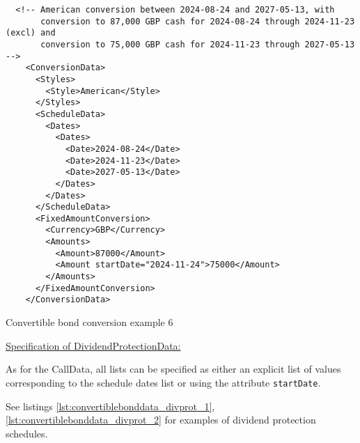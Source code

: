 \begin{listing}[H]
\begin{verbatim}
  <!-- American conversion between 2024-08-24 and 2027-05-13, with
       conversion to 87,000 GBP cash for 2024-08-24 through 2024-11-23 (excl) and
       conversion to 75,000 GBP cash for 2024-11-23 through 2027-05-13 -->
    <ConversionData>
      <Styles>
        <Style>American</Style>
      </Styles>
      <ScheduleData>
        <Dates>
          <Dates>
            <Date>2024-08-24</Date>
            <Date>2024-11-23</Date>
            <Date>2027-05-13</Date>
          </Dates>
        </Dates>
      </ScheduleData>
      <FixedAmountConversion>
        <Currency>GBP</Currency>
        <Amounts>
          <Amount>87000</Amount>
          <Amount startDate="2024-11-24">75000</Amount>
        </Amounts>
      </FixedAmountConversion>
    </ConversionData>
\end{verbatim}
\caption{Convertible bond conversion example 6}
\label{lst:convertiblebonddata_conversion_6}
\end{listing}

\underline{Specification of DividendProtectionData:}

As for the CallData, all lists can be specified as either an explicit list of values corresponding to the schedule dates
list or using the attribute \verb+startDate+.

See listings \ref{lst:convertiblebonddata_divprot_1}, \ref{lst:convertiblebonddata_divprot_2}
for examples of dividend protection schedules.

